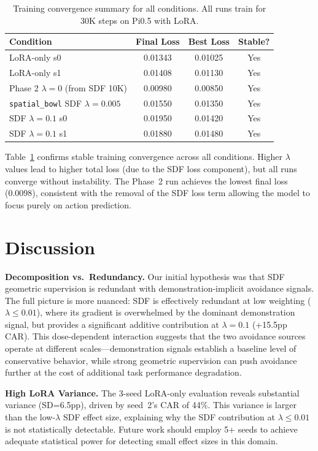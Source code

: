 \documentclass[letterpaper]{article}
\begin{document}
\begin{table}[t]
\centering
\caption{Training convergence summary for all conditions. All runs train for 30K steps on Pi0.5 with LoRA.}
\label{tab:training}
\begin{tabular}{lccc}
\toprule
\textbf{Condition} & \textbf{Final Loss} & \textbf{Best Loss} & \textbf{Stable?} \\
\midrule
LoRA-only s0 & 0.01343 & 0.01025 & Yes \\
LoRA-only s1 & 0.01408 & 0.01130 & Yes \\
Phase 2 $\lambda=0$ (from SDF 10K) & 0.00980 & 0.00850 & Yes \\
\texttt{spatial\_bowl} SDF $\lambda=0.005$ & 0.01550 & 0.01350 & Yes \\
SDF $\lambda=0.1$ s0 & 0.01950 & 0.01420 & Yes \\
SDF $\lambda=0.1$ s1 & 0.01880 & 0.01480 & Yes \\
\bottomrule
\end{tabular}
\end{table}

Table~\ref{tab:training} confirms stable training convergence across all conditions. Higher $\lambda$ values lead to higher total loss (due to the SDF loss component), but all runs converge without instability. The Phase~2 run achieves the lowest final loss (0.0098), consistent with the removal of the SDF loss term allowing the model to focus purely on action prediction.


\section{Discussion}

\textbf{Decomposition vs.\ Redundancy.} Our initial hypothesis was that SDF geometric supervision is redundant with demonstration-implicit avoidance signals. The full picture is more nuanced: SDF is effectively redundant at low weighting ($\lambda \leq 0.01$), where its gradient is overwhelmed by the dominant demonstration signal, but provides a significant additive contribution at $\lambda = 0.1$ (+15.5pp CAR). This dose-dependent interaction suggests that the two avoidance sources operate at different scales---demonstration signals establish a baseline level of conservative behavior, while strong geometric supervision can push avoidance further at the cost of additional task performance degradation.

\textbf{High LoRA Variance.} The 3-seed LoRA-only evaluation reveals substantial variance (SD=6.5pp), driven by seed~2's CAR of 44\%. This variance is larger than the low-$\lambda$ SDF effect size, explaining why the SDF contribution at $\lambda \leq 0.01$ is not statistically detectable. Future work should employ 5+ seeds to achieve adequate statistical power for detecting small effect sizes in this domain.
\end{document}
